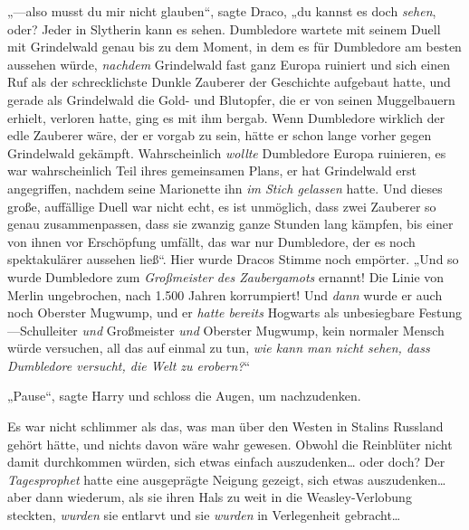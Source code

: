 „—also musst du mir nicht glauben“, sagte Draco, „du kannst es doch \emph{sehen}, oder? Jeder in Slytherin kann es sehen. Dumbledore wartete mit seinem Duell mit Grindelwald genau bis zu dem Moment, in dem es für Dumbledore am besten aussehen würde, \emph{nachdem} Grindelwald fast ganz Europa ruiniert und sich einen Ruf als der schrecklichste Dunkle Zauberer der Geschichte aufgebaut hatte, und gerade als Grindelwald die Gold- und Blutopfer, die er von seinen Muggelbauern erhielt, verloren hatte, ging es mit ihm bergab. Wenn Dumbledore wirklich der edle Zauberer wäre, der er vorgab zu sein, hätte er schon lange vorher gegen Grindelwald gekämpft. Wahrscheinlich \emph{wollte} Dumbledore Europa ruinieren, es war wahrscheinlich Teil ihres gemeinsamen Plans, er hat Grindelwald erst angegriffen, nachdem seine Marionette ihn \emph{im Stich gelassen} hatte. Und dieses große, auffällige Duell war nicht echt, es ist unmöglich, dass zwei Zauberer so genau zusammenpassen, dass sie zwanzig ganze Stunden lang kämpfen, bis einer von ihnen vor Erschöpfung umfällt, das war nur Dumbledore, der es noch spektakulärer aussehen ließ“. Hier wurde Dracos Stimme noch empörter. „Und so wurde Dumbledore zum \emph{Großmeister des Zaubergamots} ernannt! Die Linie von Merlin ungebrochen, nach 1.500 Jahren korrumpiert! Und \emph{dann} wurde er auch noch Oberster Mugwump, und er \emph{hatte bereits} Hogwarts als unbesiegbare Festung—Schulleiter \emph{und} Großmeister \emph{und} Oberster Mugwump, kein normaler Mensch würde versuchen, all das auf einmal zu tun, \emph{wie kann man nicht sehen, dass Dumbledore versucht, die Welt zu erobern?}“

„Pause“, sagte Harry und schloss die Augen, um nachzudenken.

Es war nicht schlimmer als das, was man über den Westen in Stalins Russland gehört hätte, und nichts davon wäre wahr gewesen. Obwohl die Reinblüter nicht damit durchkommen würden, sich etwas einfach auszudenken… oder doch? Der \emph{Tagesprophet} hatte eine ausgeprägte Neigung gezeigt, sich etwas auszudenken… aber dann wiederum, als sie ihren Hals zu weit in die Weasley-Verlobung steckten, \emph{wurden} sie entlarvt und sie \emph{wurden} in Verlegenheit gebracht…

